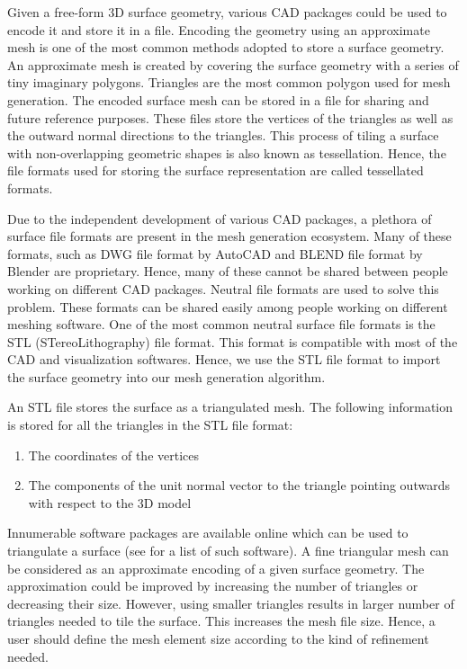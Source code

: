 Given a free-form 3D surface geometry, various CAD packages could be used to encode it and store it in a file. Encoding the geometry using an approximate mesh is one of the most common methods adopted to store a surface geometry. An approximate mesh is created by covering the surface geometry with a series of tiny imaginary polygons. Triangles are the most common polygon used for mesh generation. The encoded surface mesh can be stored in a file for sharing and future reference purposes. These files store the vertices of the triangles as well as the outward normal directions to the triangles. This process of tiling a surface with non-overlapping geometric shapes is also known as tessellation. Hence, the file formats used for storing the surface representation are called tessellated formats.

Due to the independent development of various CAD packages, a plethora of surface file formats are present in the mesh generation ecosystem. Many of these formats, such as DWG file format by AutoCAD and BLEND file format by Blender\cite{blender} are proprietary. Hence, many of these cannot be shared between people working on different CAD packages. Neutral file formats are used to solve this problem. These formats can be shared easily among people working on different meshing software. One of the most common neutral surface file formats is the STL (STereoLithography) file format. This format is compatible with most of the CAD and visualization softwares. Hence, we use the STL file format to import the surface geometry into our mesh generation algorithm.

An STL file stores the surface as a triangulated mesh. The following information is stored for all the triangles in the STL file format:

\begin{enumerate}
  \item The coordinates of the vertices
  \item The components of the unit normal vector to the triangle pointing outwards with respect to the 3D model
\end{enumerate}

Innumerable software packages are available online which can be used to triangulate a surface (see \cite{meshSoftware} for a list of such software). A fine triangular mesh can be considered as an approximate encoding of a given surface geometry. The approximation could be improved by increasing the number of triangles or decreasing their size. However, using smaller triangles results in larger number of triangles needed to tile the surface. This increases the mesh file size. Hence, a user should define the mesh element size according to the kind of refinement needed.

